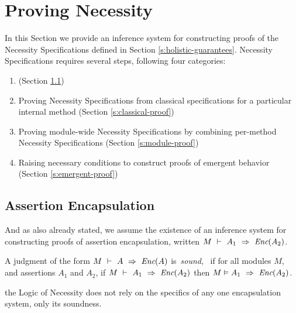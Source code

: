 
\section{Proving Necessity}  
\label{s:inference}

In this Section we provide an inference system for constructing 
proofs of the Necessity Specifications defined in Section \ref{s:holistic-guarantees}.
   Necessity Specifications requires several steps,  following four
categories:
\begin{enumerate} 
\item
{} (Section \ref{s:encaps-proof})
\item
Proving Necessity Specifications from classical specifications for a particular internal method (Section \ref{s:classical-proof})
\item
Proving module-wide Necessity Specifications by combining per-method Necessity Specifications (Section \ref{s:module-proof})
\item
Raising necessary conditions to construct proofs of emergent behavior (Section \ref{s:emergent-proof})
\end{enumerate}

\subsection{Assertion Encapsulation}
\label{s:encaps-proof}

And as also  already stated, we assume the existence of  
an inference system for constructing proofs of assertion encapsulation, 
written $M\ \vdash\ A_1\ \Rightarrow\ \textit{Enc}(A_2)$.

\begin{definition}
\label{lem:encap-soundness}
A judgment of the form $M\ \vdash\ A\ \Rightarrow\ \textit{Enc}(A)$  is\  \emph{sound}, \ if 
for all modules $M$, and assertions $A_1$ and $A_2$, if 
$M\ \vdash\ A_1\ \Rightarrow\ \textit{Enc}(A_2)$ then $M \vDash A_1\ \Rightarrow\ \textit{Enc}(A_2)$.
\end{definition}


 the Logic of Necessity 
does not rely on the specifics of any one encapsulation system, only its soundness.

